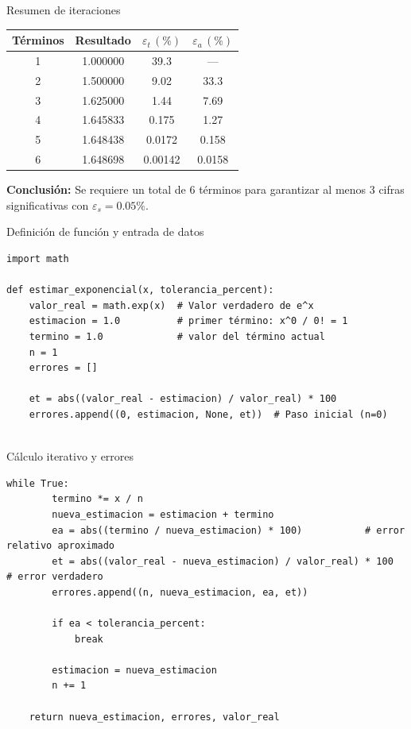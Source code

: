 \documentclass[main.tex]{subfiles}
\begin{document}
\begin{frame}[c]{Resumen de iteraciones}
\footnotesize
\begin{tabular}{@{}cccc@{}}
\toprule

\textbf{Términos} & \textbf{Resultado} & \(\varepsilon_t\, (\%)\) & \(\varepsilon_a\, (\%)\) \\
\midrule
1 & 1.000000 & 39.3  & --- \\
2 & 1.500000 & 9.02  & 33.3 \\
3 & 1.625000 & 1.44  & 7.69 \\
4 & 1.645833 & 0.175 & 1.27 \\
5 & 1.648438 & 0.0172 & 0.158 \\
6 & 1.648698 & 0.00142 & 0.0158 \\
\bottomrule
\end{tabular}

\vspace{1ex}
\textbf{Conclusión:} Se requiere un total de 6 términos para garantizar al menos 3 cifras significativas con \(\varepsilon_s = 0.05\%\).
\end{frame}


\begin{frame}[fragile]{Definición de función y entrada de datos}

\begin{lstlisting}[style=mypython]
import math

def estimar_exponencial(x, tolerancia_percent):
    valor_real = math.exp(x)  # Valor verdadero de e^x
    estimacion = 1.0          # primer término: x^0 / 0! = 1
    termino = 1.0             # valor del término actual
    n = 1
    errores = []

    et = abs((valor_real - estimacion) / valor_real) * 100
    errores.append((0, estimacion, None, et))  # Paso inicial (n=0)


\end{lstlisting}
\end{frame}

\begin{frame}[fragile]{Cálculo iterativo y errores}
\begin{lstlisting}[style=mypython]
     while True:
        termino *= x / n
        nueva_estimacion = estimacion + termino
        ea = abs((termino / nueva_estimacion) * 100)           # error relativo aproximado
        et = abs((valor_real - nueva_estimacion) / valor_real) * 100  # error verdadero
        errores.append((n, nueva_estimacion, ea, et))

        if ea < tolerancia_percent:
            break

        estimacion = nueva_estimacion
        n += 1

    return nueva_estimacion, errores, valor_real

\end{lstlisting}
\end{frame}
\end{document}
